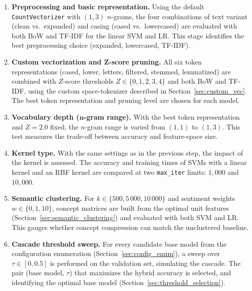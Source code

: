 \documentclass[a4paper,twoside,12pt]{book}
\newcommand{\zscore}{Z}
\newcommand{\logreg}{LR}
\newcommand{\code}[1]{\texttt{#1}}
\newcommand{\kconcepts}{k}
\newcommand{\weightparam}{w}
\newcommand{\thresh}{\tau}
\begin{document}
\begin{enumerate}
	\item \textbf{Preprocessing and basic representation.} Using the default \texttt{CountVectorizer} with $(1,3)$ $n$-grams, the four combinations of text variant (clean vs.\ expanded) and casing (cased vs.\ lowercased) are evaluated with both BoW and TF-IDF for the linear SVM and \logreg{}. This stage identifies the best preprocessing choice (expanded, lowercased, TF-IDF).
	
	\item \textbf{Custom vectorization and $\mathbf{\zscore}$-score pruning.} All six token representations (cased, lower, letters, filtered, stemmed, lemmatized) are combined with $\zscore$-score thresholds $\zscore \in \{0,1,2,3,4\}$ and both BoW and TF-IDF, using the custom space-tokenizer described in Section~\ref{sec:custom_vec}. The best token representation and pruning level are chosen for each model.
	
	\item \textbf{Vocabulary depth ($\boldsymbol{n}$-gram range).} With the best token representation and $\zscore=2.0$ fixed, the $n$-gram range is varied from $(1,1)$ to $(1,3)$. This test measures the trade-off between accuracy and feature-space size.
	
	\item \textbf{Kernel type.} With the same settings as in the previous step, the impact of the kernel is assessed. The accuracy and training times of SVMs with a linear kernel and an RBF kernel are compared at two \code{max\_iter} limits: $1,000$ and $10,000$.
	
	\item \textbf{Semantic clustering.} For $\kconcepts \in \{500, 5\,000, 10\,000\}$ and sentiment weights $\weightparam \in \{0, 1, 10\}$, concept matrices are built from the optimal unit features (Section~\ref{sec:semantic_clustering}) and evaluated with both SVM and \logreg. This gauges whether concept compression can match the unclustered baseline.
	
	\item \textbf{Cascade threshold sweep.} For every candidate base model from the configuration enumeration (Section~\ref{sec:config_enum}), a sweep over $\thresh \in [0,0.5]$ is performed on the validation set, simulating the cascade. The pair (base model, $\thresh$) that maximizes the hybrid accuracy is selected, and identifying the optimal base model (Section~\ref{sec:threshold_selection}).
\end{enumerate}
\end{document}
